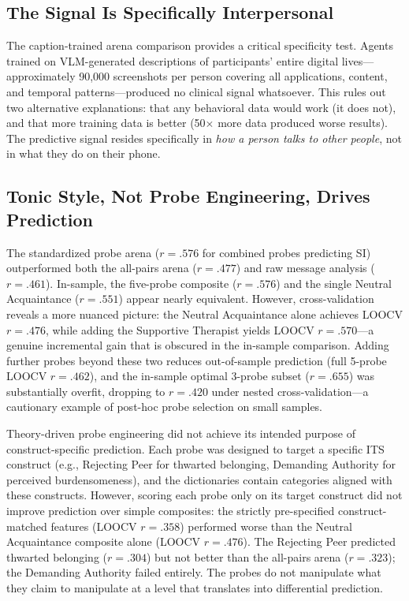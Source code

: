 \documentclass[review,12pt,authoryear]{elsarticle}
\begin{document}
\subsection{The Signal Is Specifically Interpersonal}

The caption-trained arena comparison provides a critical specificity test. Agents trained on VLM-generated descriptions of participants' entire digital lives---approximately 90,000 screenshots per person covering all applications, content, and temporal patterns---produced no clinical signal whatsoever. This rules out two alternative explanations: that any behavioral data would work (it does not), and that more training data is better (50$\times$ more data produced worse results). The predictive signal resides specifically in \textit{how a person talks to other people}, not in what they do on their phone.

\subsection{Tonic Style, Not Probe Engineering, Drives Prediction}

The standardized probe arena ($r = .576$ for combined probes predicting SI) outperformed both the all-pairs arena ($r = .477$) and raw message analysis ($r = .461$). In-sample, the five-probe composite ($r = .576$) and the single Neutral Acquaintance ($r = .551$) appear nearly equivalent. However, cross-validation reveals a more nuanced picture: the Neutral Acquaintance alone achieves LOOCV $r = .476$, while adding the Supportive Therapist yields LOOCV $r = .570$---a genuine incremental gain that is obscured in the in-sample comparison. Adding further probes beyond these two reduces out-of-sample prediction (full 5-probe LOOCV $r = .462$), and the in-sample optimal 3-probe subset ($r = .655$) was substantially overfit, dropping to $r = .420$ under nested cross-validation---a cautionary example of post-hoc probe selection on small samples.

Theory-driven probe engineering did not achieve its intended purpose of construct-specific prediction. Each probe was designed to target a specific ITS construct (e.g., Rejecting Peer for thwarted belonging, Demanding Authority for perceived burdensomeness), and the dictionaries contain categories aligned with these constructs. However, scoring each probe only on its target construct did not improve prediction over simple composites: the strictly pre-specified construct-matched features (LOOCV $r = .358$) performed worse than the Neutral Acquaintance composite alone (LOOCV $r = .476$). The Rejecting Peer predicted thwarted belonging ($r = .304$) but not better than the all-pairs arena ($r = .323$); the Demanding Authority failed entirely. The probes do not manipulate what they claim to manipulate at a level that translates into differential prediction.
\end{document}
